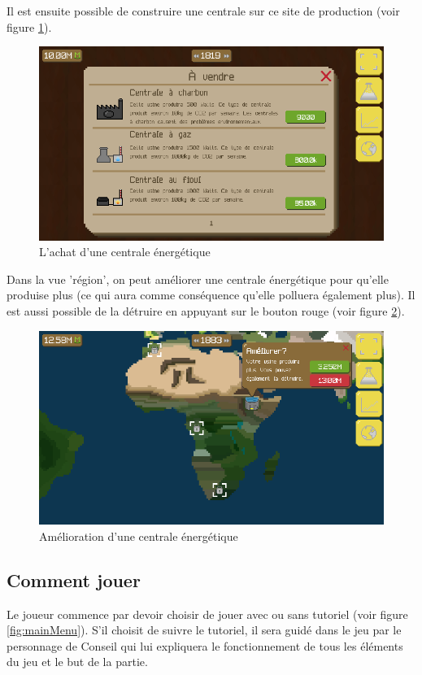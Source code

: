\documentclass{article}
\begin{document}
        Il est ensuite possible de construire une centrale sur ce site de production (voir figure \ref{fig:buyPlant}).
        \begin{figure}[H]
                \includegraphics[width=\linewidth]{../images/buyPlant}
                \caption{L'achat d'une centrale énergétique}
                \label{fig:buyPlant}
        \end{figure}
        
        Dans la vue 'région', on peut améliorer une centrale énergétique pour qu'elle produise plus (ce qui aura comme conséquence qu'elle polluera également plus). Il est aussi possible de la détruire en appuyant sur le bouton rouge (voir figure \ref{fig:upgradePlant}).
        \begin{figure}[H]
                \includegraphics[width=\linewidth]{../images/upgradePlant}
                \caption{Amélioration d'une centrale énergétique}
                \label{fig:upgradePlant}
        \end{figure}
        
        
        \subsection{Comment jouer}
        Le joueur commence par devoir choisir de jouer avec ou sans tutoriel (voir figure \ref{fig:mainMenu}).
        S'il choisit de suivre le tutoriel, il sera guidé dans le jeu par le personnage de Conseil qui lui expliquera le fonctionnement de tous les éléments du jeu et le but de la partie. 
        
\end{document}
